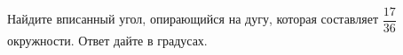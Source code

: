 \begin{ex}
	\begin{condition}
		Найдите вписанный угол, опирающийся на дугу, которая составляет \( \dfrac{17}{36} \)  окружности. Ответ дайте в градусах.
	\end{condition}
\end{ex}